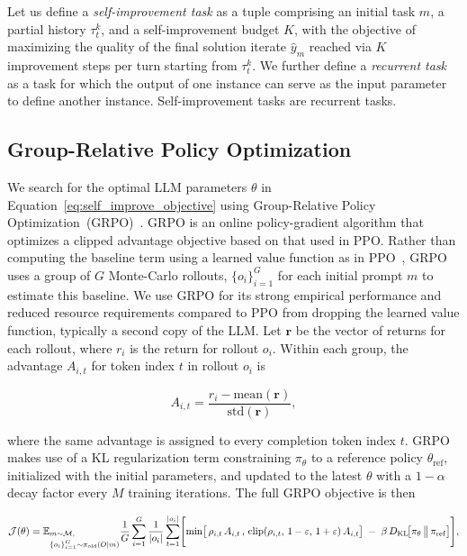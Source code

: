 \documentclass[10pt]{article} %
\begin{document}
Let us define a \emph{self-improvement task} as a tuple comprising an initial task $m$, a partial history $\tau^k_t$, and a self-improvement budget $K$, with the objective of maximizing the quality of the final solution iterate $\hat{y}_m$ reached via $K$ improvement steps per turn starting from $\tau^k_t$. We further define a \emph{recurrent task} as a task for which the output of one instance can serve as the input parameter to define another instance. Self-improvement tasks are recurrent tasks.

\subsection{Group-Relative Policy Optimization}
\label{subsection:grpo}

We search for the optimal LLM parameters $\theta$ in Equation~\ref{eq:self_improve_objective} using Group-Relative Policy Optimization~(GRPO)~\citep{shao2024deepseekmath}. GRPO is an online policy-gradient algorithm that optimizes a clipped advantage objective based on that used in PPO. Rather than computing the baseline term using a learned value function as in PPO~\citep{schulman2017proximal}, GRPO uses a group of $G$ Monte-Carlo rollouts, $\{o_i\}_{i=1}^G$ for each initial prompt $m$ to estimate this baseline. We use GRPO for its strong empirical performance and reduced resource requirements compared to PPO from dropping the learned value function, typically a second copy of the LLM. Let $\textbf{r}$ be the vector of returns for each rollout, where $r_i$ is the return for rollout $o_i$. Within each group, the advantage $A_{i,t}$ for token index $t$ in rollout $o_i$ is

\begin{equation}
\label{eq:grpo_advantage}
    A_{i,t} = \frac{r_i - \text{mean}(\textbf{r})}{\text{std}(\textbf{r})},
\end{equation}

where the same advantage is assigned to every completion token index $t$. GRPO makes use of a KL regularization term constraining $\pi_{\theta}$ to a reference policy $\theta_{\text{ref}}$, initialized with the initial parameters, and updated to the latest $\theta$ with a $1 - \alpha$ decay factor every $M$ training iterations. The full GRPO objective is then

\begin{equation}
\label{eq:grpo_objective}
\centering
\mathcal{J}(\theta) = \mathbb{E}_{\begin{subarray}{l}
      m\sim\mathcal{M},\\[2pt]
      \{o_i\}_{i=1}^{G}\sim\pi_{\text{old}}(O|m)
    \end{subarray}}
\frac{1}{G}
\sum_{i=1}^{G}
\frac{1}{\lvert o_i\rvert}
\sum_{t=1}^{\lvert o_i\rvert}
\Biggl[
\min\bigl[\,
\rho_{i,t}\, A_{i,t}\,,\,
\mathrm{clip}(\rho_{i,t},\,1-\varepsilon,\,1+\varepsilon)\,A_{i,t}
\bigr]
\;-\;\beta\,D_{\mathrm{KL}}\!\bigl[\pi_{\theta}\,\big\Vert\,\pi_{\mathrm{ref}}\bigr]
\Biggr],
\end{equation}
\end{document}
